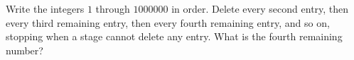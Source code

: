Write the integers $1$ through $1000000$ in order. Delete every second entry, then every third remaining entry, then every fourth remaining entry, and so on, stopping when a stage cannot delete any entry. What is the fourth remaining number?
